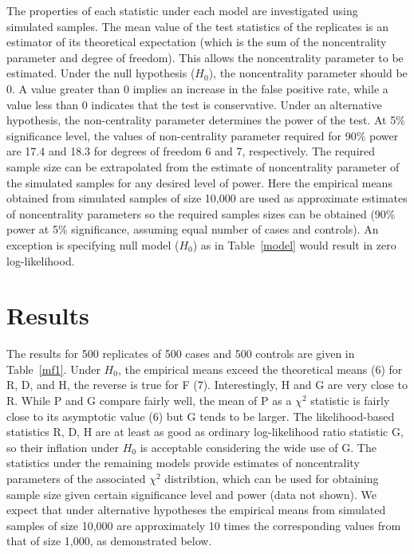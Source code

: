 The properties of each statistic under each model are investigated using
simulated samples.  The mean value of the test statistics of the replicates is
an estimator of its theoretical expectation (which is the sum of the
noncentrality parameter and degree of freedom).  This allows the noncentrality
parameter to be estimated.  Under the null hypothesis ($H_0$), the
noncentrality parameter should be 0.  A value greater than 0 implies an
increase in the false positive rate, while a value less than 0 indicates that
the test is conservative.  Under an alternative hypothesis, the non-centrality
parameter determines the power of the test.  At 5\% significance level, the
values of non-centrality parameter required for 90\% power are 17.4 and 18.3
for degrees of freedom 6 and 7, respectively.  The required sample size can be
extrapolated from the estimate of noncentrality parameter of the simulated
samples for any desired level of power.  Here the empirical means obtained from
simulated samples of size 10,000 are used as approximate estimates of
noncentrality parameters so the required samples sizes can be obtained (90\%
power at 5\% significance, assuming equal number of cases and controls).  An
exception is specifying null model ($H_0$) as in Table~\ref{model} would result
in zero log-likelihood.


\section{Results}

The results for 500 replicates of 500 cases and 500 controls are given in
Table~\ref{mf1}.  Under $H_0$, the empirical means exceed the theoretical means
(6) for R, D, and H, the reverse is true for F (7).  Interestingly, H and G are
very close to R.  While P and G compare fairly well, the mean of P as a
$\chi^2$ statistic is fairly close to its asymptotic value (6) but G tends to
be larger.  The likelihood-based statistics R, D, H are at least as good as
ordinary log-likelihood ratio statistic G, so their inflation under $H_0$ is
acceptable considering the wide use of G.  The statistics under the remaining
models provide estimates of noncentrality parameters of the associated $\chi^2$
distribtion, which can be used for obtaining sample size given certain
significance level and power (data not shown).  We expect that under
alternative hypotheses the empirical means from simulated samples of size
10,000 are approximately 10 times the corresponding values from that of size
1,000, as demonstrated below.

